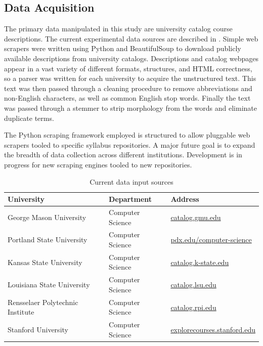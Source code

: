 \subsection{Data Acquisition}

The primary data manipulated in this study are university catalog course
descriptions. The current experimental data sources are described in
. Simple web scrapers were written using Python
and BeautifulSoup to download publicly available descriptions from
university catalogs. Descriptions and catalog webpages appear in a vast
variety of different formats, structures, and HTML correctness, so a parser
was written for each university to acquire the unstructured text. This text
was then passed through a cleaning procedure to remove abbreviations and
non-English characters, as well as common English stop words. Finally the
text was passed through a stemmer to strip morphology from the words and
eliminate duplicate terms.

The Python scraping framework employed is structured to allow pluggable web
scrapers tooled to specific syllabus repositories. A major future goal is
to expand the breadth of data collection across different institutions.
Development is in progress for new scraping engines tooled to new
repositories.

\begin{table}[ht]
\centering
\begin{tabular}{lll}
\toprule
University & Department & Address \\
\midrule
George Mason University & Computer Science & \url{catalog.gmu.edu} \\
Portland State University & Computer Science & \url{pdx.edu/computer-science} \\
Kansas State University & Computer Science & \url{catalog.k-state.edu} \\
Louisiana State University & Computer Science & \url{catalog.lsu.edu} \\
Rensselaer Polytechnic Institute & Computer Science & \url{catalog.rpi.edu} \\
Stanford University & Computer Science & \url{explorecourses.stanford.edu} \\
\bottomrule
\end{tabular}
\caption{Current data input sources\label{table:data-sources}}
\end{table}


